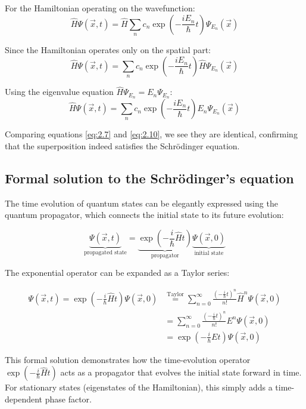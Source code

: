 \documentclass[italian]{HKNdocument}
\begin{document}
For the Hamiltonian operating on the wavefunction:
\begin{equation}
\hat{H}\Psi(\vec{x},t) = \hat{H}\sum_n c_n\exp\left(-\frac{iE_n}{\hbar}t\right)\Psi_{E_n}(\vec{x})
\end{equation}

Since the Hamiltonian operates only on the spatial part:
\begin{equation}
\hat{H}\Psi(\vec{x},t) = \sum_n c_n\exp\left(-\frac{iE_n}{\hbar}t\right)\hat{H}\Psi_{E_n}(\vec{x})
\end{equation}

Using the eigenvalue equation $\hat{H}\Psi_{E_n} = E_n\Psi_{E_n}$:
\begin{equation}
\hat{H}\Psi(\vec{x},t) = \sum_n c_n\exp\left(-\frac{iE_n}{\hbar}t\right)E_n\Psi_{E_n}(\vec{x}) \label{eq:2.10}
\end{equation}

Comparing equations \eqref{eq:2.7} and \eqref{eq:2.10}, we see they are identical, confirming that the superposition indeed satisfies the Schrödinger equation.

\subsection{Formal solution to the Schrödinger's equation}

The time evolution of quantum states can be elegantly expressed using the quantum propagator, which connects the initial state to its future evolution:

\begin{equation}
\underbrace{\Psi(\vec{x},t)}_{\text{propagated state}} = \underbrace{\exp\left(-\frac{i}{\hbar}\hat{H}t\right)}_{\text{propagator}}\underbrace{\Psi(\vec{x},0)}_{\text{initial state}}
\end{equation}

The exponential operator can be expanded as a Taylor series:

\begin{align}
\Psi(\vec{x},t) = \exp\left(-\frac{i}{\hbar}\hat{H}t\right)\Psi(\vec{x},0) &\stackrel{\text{Taylor}}{=} \sum_{n=0}^{\infty}\frac{\left(-\frac{i}{\hbar}t\right)^n}{n!}\hat{H}^n\Psi(\vec{x},0) \\
&= \sum_{n=0}^{\infty}\frac{\left(-\frac{i}{\hbar}t\right)^n}{n!}E^n\Psi(\vec{x},0)  \\
&= \exp\left(-\frac{i}{\hbar}Et\right)\Psi(\vec{x},0)
\end{align}

This formal solution demonstrates how the time-evolution operator $\exp\left(-\frac{i}{\hbar}\hat{H}t\right)$ acts as a propagator that evolves the initial state forward in time. For stationary states (eigenstates of the Hamiltonian), this simply adds a time-dependent phase factor.
\end{document}
